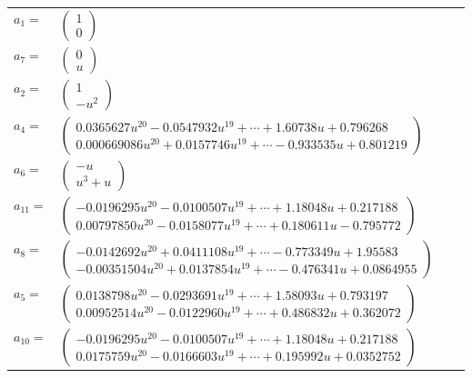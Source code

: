 \documentclass[1p]{elsarticle_modified}
\theoremstyle{definition}
\begin{document}
\begin{tabular}{m{7pt} m{180pt} m{7pt} m{180pt} }
\flushright $a_{1}=$&$\begin{pmatrix}1\\0\end{pmatrix}$ \\
\flushright $a_{7}=$&$\begin{pmatrix}0\\u\end{pmatrix}$ \\
\flushright $a_{2}=$&$\begin{pmatrix}1\\- u^2\end{pmatrix}$ \\
\flushright $a_{4}=$&$\begin{pmatrix}0.0365627 u^{20}-0.0547932 u^{19}+\cdots+1.60738 u+0.796268\\0.000669086 u^{20}+0.0157746 u^{19}+\cdots-0.933535 u+0.801219\end{pmatrix}$ \\
\flushright $a_{6}=$&$\begin{pmatrix}- u\\u^3+u\end{pmatrix}$ \\
\flushright $a_{11}=$&$\begin{pmatrix}-0.0196295 u^{20}-0.0100507 u^{19}+\cdots+1.18048 u+0.217188\\0.00797850 u^{20}-0.0158077 u^{19}+\cdots+0.180611 u-0.795772\end{pmatrix}$ \\
\flushright $a_{8}=$&$\begin{pmatrix}-0.0142692 u^{20}+0.0411108 u^{19}+\cdots-0.773349 u+1.95583\\-0.00351504 u^{20}+0.0137854 u^{19}+\cdots-0.476341 u+0.0864955\end{pmatrix}$ \\
\flushright $a_{5}=$&$\begin{pmatrix}0.0138798 u^{20}-0.0293691 u^{19}+\cdots+1.58093 u+0.793197\\0.00952514 u^{20}-0.0122960 u^{19}+\cdots+0.486832 u+0.362072\end{pmatrix}$ \\
\flushright $a_{10}=$&$\begin{pmatrix}-0.0196295 u^{20}-0.0100507 u^{19}+\cdots+1.18048 u+0.217188\\0.0175759 u^{20}-0.0166603 u^{19}+\cdots+0.195992 u+0.0352752\end{pmatrix}$ \\

\end{tabular}
\end{document}
